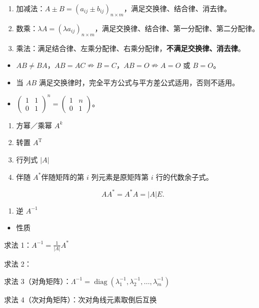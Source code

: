 \documentclass[UTF8,fontset=fandol,zihao=5]{ctexart}
\newcommand{\diag}{\operatorname{diag}}
\begin{document}
\begin{enumerate}[label=（\arabic*）]
  \item 加减法：$A\pm B=(a_{ij}\pm b_{ij})_{n\times m}$，满足交换律、结合律、消去律。
  \item 数乘：$\lambda A=(\lambda a_{ij})_{n\times m}$，满足交换律、结合律、第一分配律、第二分配律。
  \item 乘法：满足结合律、左乘分配律、右乘分配律，\textbf{不满足交换律、消去律}。
\end{enumerate}

\begin{itemize}
  \item $AB\ne BA$，$AB=AC\nRightarrow B=C$，$AB=O\nRightarrow A=O$ 或 $B=O$。
  \item 当 $AB$ 满足交换律时，完全平方公式与平方差公式适用，否则不适用。
  \item $\displaystyle\begin{pmatrix}1&1\\0&1\end{pmatrix}^{n}=\begin{pmatrix}1&n\\0&1\end{pmatrix}$。
\end{itemize}

\begin{enumerate}[label=（\arabic*）,start=4]
  \item 方幂／乘幂 $A^k$
  \item 转置 $A^{\mathrm T}$
  \item 行列式 $|A|$
  \item 伴随 $A^{*}$\quad 伴随矩阵的第 $i$ 列元素是原矩阵第 $i$ 行的代数余子式。
\end{enumerate}

\begin{method}[【公式】伴随矩阵重要公式]
\[
AA^{*}=A^{*}A=|A|E.
\]
\end{method}

\begin{enumerate}[label=（\arabic*）,start=8]
  \item 逆 $A^{-1}$
\end{enumerate}

\begin{itemize}
  \item 性质
\end{itemize}

\begin{method}[【方法】逆矩阵的求法]
求法 1：$\displaystyle A^{-1}=\frac{1}{|A|}A^{*}$

求法 2：

求法 3（对角矩阵）：$\Lambda^{-1}=\diag(\lambda_1^{-1},\lambda_2^{-1},\ldots,\lambda_m^{-1})$

求法 4（次对角矩阵）：次对角线元素取倒后互换
\end{method}
\end{document}
